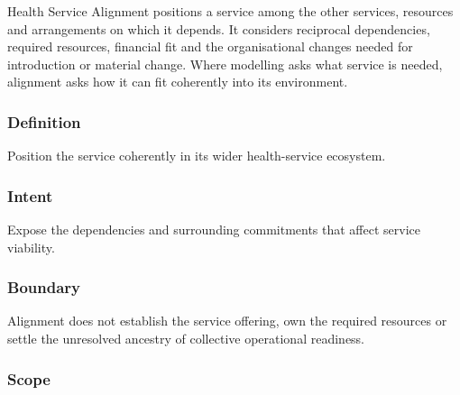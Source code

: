 Health Service Alignment positions a service among the other services, resources and arrangements on which it depends. It considers reciprocal dependencies, required resources, financial fit and the organisational changes needed for introduction or material change. Where modelling asks what service is needed, alignment asks how it can fit coherently into its environment.

\subsubsection*{Definition}

Position the service coherently in its wider health-service ecosystem.

\subsubsection*{Intent}

Expose the dependencies and surrounding commitments that affect service viability.

\subsubsection*{Boundary}

Alignment does not establish the service offering, own the required resources or settle the unresolved ancestry of collective operational readiness.

\subsubsection*{Scope}
